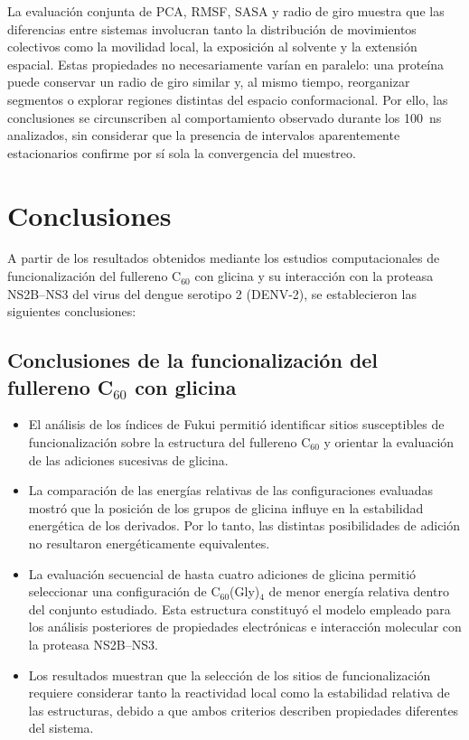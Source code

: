 La evaluación conjunta de PCA, RMSF, SASA y radio de giro muestra que las diferencias entre sistemas involucran tanto la distribución de movimientos colectivos como la movilidad local, la exposición al solvente y la extensión espacial. Estas propiedades no necesariamente varían en paralelo: una proteína puede conservar un radio de giro similar y, al mismo tiempo, reorganizar segmentos o explorar regiones distintas del espacio conformacional. Por ello, las conclusiones se circunscriben al comportamiento observado durante los 100~ns analizados, sin considerar que la presencia de intervalos aparentemente estacionarios confirme por sí sola la convergencia del muestreo.
\chapter{Conclusiones}

A partir de los resultados obtenidos mediante los estudios
computacionales de funcionalización del fullereno C$_{60}$
con glicina y su interacción con la proteasa NS2B--NS3
del virus del dengue serotipo 2 (DENV-2), se establecieron
las siguientes conclusiones:


\section{Conclusiones de la funcionalización del fullereno
C$_{60}$ con glicina}

\begin{itemize}

    \item El análisis de los índices de Fukui permitió
    identificar sitios susceptibles de funcionalización
    sobre la estructura del fullereno C$_{60}$ y orientar
    la evaluación de las adiciones sucesivas de glicina.

    \item La comparación de las energías relativas de
    las configuraciones evaluadas mostró que la
    posición de los grupos de glicina influye en
    la estabilidad energética de los derivados.
    Por lo tanto, las distintas posibilidades
    de adición no resultaron energéticamente
    equivalentes.

    \item La evaluación secuencial de hasta cuatro
    adiciones de glicina permitió seleccionar
    una configuración de C$_{60}$(Gly)$_4$
    de menor energía relativa dentro del conjunto
    estudiado. Esta estructura constituyó el
    modelo empleado para los análisis posteriores
    de propiedades electrónicas e interacción
    molecular con la proteasa NS2B--NS3.

    \item Los resultados muestran que la selección
    de los sitios de funcionalización requiere
    considerar tanto la reactividad local como
    la estabilidad relativa de las estructuras,
    debido a que ambos criterios describen
    propiedades diferentes del sistema.

\end{itemize}

